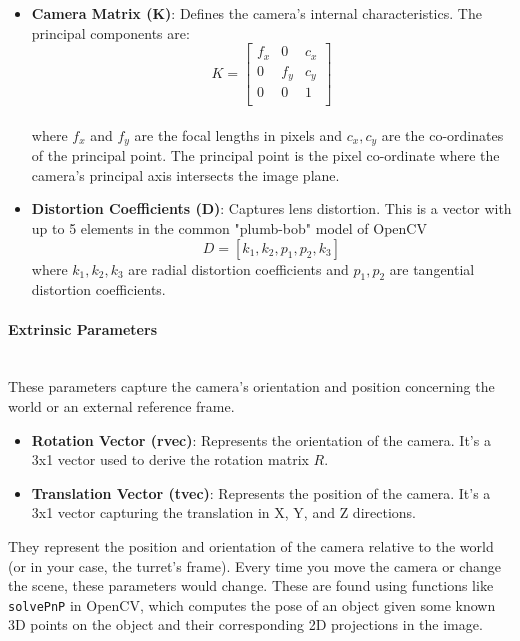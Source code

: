 \begin{itemize}
    \item \textbf{Camera Matrix (K)}: Defines the camera's internal characteristics. The principal components are:
          \begin{equation}
              K = \begin{bmatrix}
                  f_x & 0   & c_x \\
                  0   & f_y & c_y \\
                  0   & 0   & 1   \\
              \end{bmatrix}
          \end{equation}\\
          where \(f_x\) and \(f_y\) are the focal lengths in pixels and \(c_x, c_y\) are the co-ordinates of the principal point. The principal point is the pixel co-ordinate where the camera's principal axis intersects the image plane.

    \item \textbf{Distortion Coefficients (D)}: Captures lens distortion. This is a vector with up to 5 elements in the common "plumb-bob" model of OpenCV
          \[
              D = [k_1, k_2, p_1, p_2, k_3]
          \]
          where \(k_1, k_2, k_3\) are radial distortion coefficients and \(p_1, p_2\) are tangential distortion coefficients.
\end{itemize}

\paragraph{Extrinsic Parameters}\mbox{}\\
These parameters capture the camera's orientation and position concerning the world or an external reference frame.

\begin{itemize}
    \item \textbf{Rotation Vector (rvec)}: Represents the orientation of the camera. It's a 3x1 vector used to derive the rotation matrix \( R \).

    \item \textbf{Translation Vector (tvec)}: Represents the position of the camera. It's a 3x1 vector capturing the translation in X, Y, and Z directions.
\end{itemize}

They represent the position and orientation of the camera relative to the world (or in your case, the turret's frame). Every time you move the camera or change the scene, these parameters would change. These are found using functions like \verb|solvePnP| in OpenCV, which computes the pose of an object given some known 3D points on the object and their corresponding 2D projections in the image.


